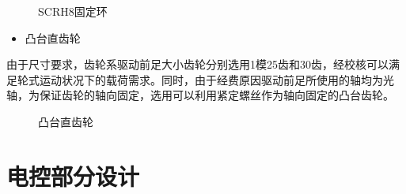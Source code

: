 \documentclass[12pt]{article}
\begin{document}
\begin{CJK}{UTF8}{song}
\begin{figure}[H]
{%
}
\quad
{}
\caption{SCRH8固定环}
\end{figure}
\begin{itemize}
\item 凸台直齿轮
\end{itemize}
由于尺寸要求，齿轮系驱动前足大小齿轮分别选用1模25齿和30齿，经校核可以满足轮式运动状况下的载荷需求。同时，由于经费原因驱动前足所使用的轴均为光轴，为保证齿轮的轴向固定，选用可以利用紧定螺丝作为轴向固定的凸台齿轮。
\begin{figure}[H]
{}
\quad
{}
\caption{凸台直齿轮}
\end{figure}

\section{电控部分设计}

\end{CJK}
\end{document}
